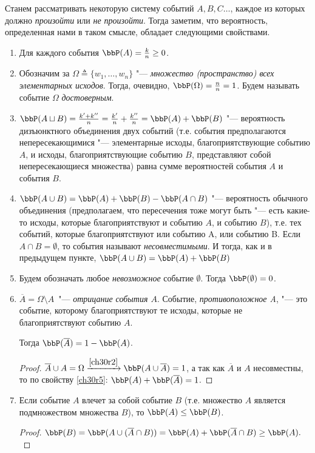 Станем рассматривать некоторую систему событий $A,B,C\dots $, каждое из которых должно \textit{произойти} или \textit{не произойти}. Тогда заметим, что вероятность, определенная нами в таком смысле, обладает следующими свойствами.
\begin{enumerate}
\item 
Для каждого события $\bbP(A)=\frac{k}{n}\ge 0$.
\item \label{ch30r2}
Обозначим за $\Omega \triangleq \{w_1, \dots,w_n\}$ "--- \textit{множество (пространство) всех элементарных исходов}. Тогда, очевидно, $\bbP(\Omega)=\frac{n}{n}=1$. Будем называть событие $\Omega$ \textit{достоверным}. 

\item 
$\bbP(A\sqcup B)=\frac{k'+k''}{n}=\frac{k'}{n}+\frac{k''}{n}=\bbP(A)+\bbP(B)$ "--- вероятность дизъюнктного объединения двух событий (т.е. события предполагаются непересекающимися "--- элементарные исходы, благоприятствующие событию $A$, и исходы, благоприятствующие событию $B$, представляют собой непересекающиеся множества) равна сумме вероятностей события $A$ и события $B$.
\item \label{ch30r5}
$\bbP(A\cup B)=\bbP(A)+\bbP(B)-\bbP(A\cap B)$ "--- вероятность обычного объединения (предполагаем, что пересечения тоже могут быть "--- есть какие-то исходы, которые благоприятствуют и событию $A$, и событию $B$), т.е. тех событий, которые благоприятствуют или событию A, или событию B. Если $A\cap B=\emptyset$, то события называют \textit{несовместимыми}. И тогда, как и в предыдущем пункте, $\bbP(A\cup B)=\bbP(A)+\bbP(B)$
\item
Будем обозначать любое \textit{невозможное} событие $\emptyset$. Тогда $\bbP(\emptyset)=0$. 

\item
$\overline{A}=\Omega\setminus A$~"--- \textit{отрицание события $A$}. Событие, \textit{противоположное A}, "--- это событие, которому благоприятствуют те исходы, которые не благоприятствуют событию $A$. 

Тогда $\bbP(\overline{A})=1-\bbP(A)$.
\begin{proof}
$\overline{A}\cup A=\Omega\xrightarrow{\ref{ch30r2}}\bbP(A\cup\overline{A}) = 1$, а так как $\overline{A}$ и $A$ несовместны, то по свойству \ref{ch30r5}:  $\bbP(A)+\bbP(\overline{A}) = 1$.
\end{proof}

\item
Если событие $A$ влечет за собой событие $B$ (т.е. множество $A$ является подмножеством множества $B$), то $\bbP(A)\le \bbP(B)$.
\begin{proof}
$\bbP(B)=\bbP(A\cup (\overline{A}\cap B))=\bbP(A)+\bbP(\overline{A}\cap B)\ge \bbP(A).$
\end{proof}


\end{enumerate}
